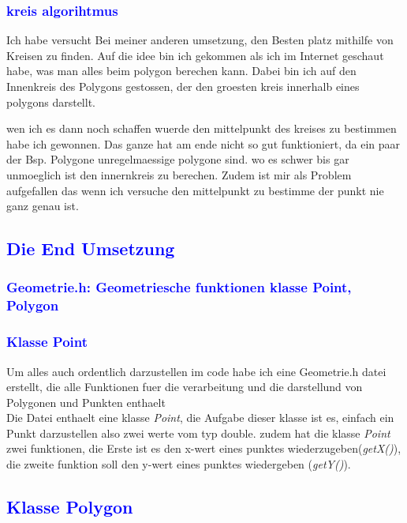 \documentclass{article}
\begin{document}
\subsubsection{\textcolor{blue}{kreis algorihtmus}}
\begin{center}
Ich habe versucht Bei meiner anderen umsetzung, den Besten platz mithilfe von Kreisen zu finden. Auf die idee bin ich gekommen als ich im Internet geschaut habe, was man alles beim polygon berechen kann. Dabei bin ich auf den Innenkreis des Polygons gestossen, der den groesten kreis innerhalb eines polygons darstellt.
\par\medskip
 wen ich es dann noch schaffen wuerde den mittelpunkt des kreises zu bestimmen habe ich gewonnen. Das ganze hat am ende nicht so gut funktioniert, da ein paar der Bsp. Polygone unregelmaessige polygone sind. wo es schwer bis gar unmoeglich ist den innernkreis zu berechen. Zudem ist mir als Problem aufgefallen das wenn ich versuche den mittelpunkt zu bestimme der punkt nie ganz genau ist.
\end{center}
\subsection{\textcolor{blue}{Die End Umsetzung}}
\subsubsection{\textcolor{blue}{Geometrie.h: Geometriesche funktionen klasse Point, Polygon}}
\subsubsection{\textcolor{blue}{Klasse Point}}
\begin{center}
Um alles auch ordentlich darzustellen im code habe ich eine Geometrie.h datei erstellt, die alle Funktionen fuer die verarbeitung und die darstellund von Polygonen und Punkten enthaelt
\\
Die Datei enthaelt eine klasse \textit{Point}, die Aufgabe dieser klasse ist es, einfach ein Punkt darzustellen also zwei werte vom typ double. zudem hat die klasse \textit{Point} zwei funktionen, die Erste ist es den x-wert eines punktes wiederzugeben(\textit{getX()}), die zweite funktion soll den y-wert eines punktes wiedergeben (\textit{getY()}).  
\end{center}
\subsection{\textcolor{blue}{Klasse Polygon}}
\end{document}
